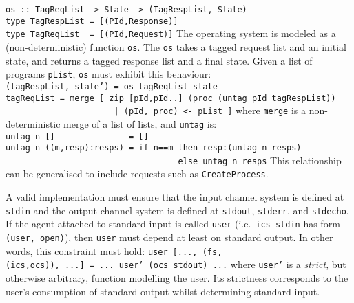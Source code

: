 \bprog
\mbox{\tt os\ ::\ TagReqList\ ->\ State\ ->\ (TagRespList,\ State)}\\
\mbox{\tt type\ TagRespList\ =\ [(PId,Response)]}\\
\mbox{\tt type\ TagReqList\ \ =\ [(PId,Request)]}
\eprog
The operating system is modeled as a (non-deterministic) function
\mbox{\tt os}. The \mbox{\tt os} takes a tagged request list and an initial state, and
returns a tagged response list and a final state.  Given a list of
programs \mbox{\tt pList}, \mbox{\tt os} must exhibit this behaviour:
\bprog
\mbox{\tt (tagRespList,\ state')\ =\ os\ tagReqList\ state}\\
\mbox{\tt tagReqList\ =\ merge\ [\ zip\ [pId,pId..]\ (proc\ (untag\ pId\ tagRespList))}\\
\mbox{\tt \ \ \ \ \ \ \ \ \ \ \ \ \ \ \ \ \ \ \ \ \ \ |\ (pId,\ proc)\ <-\ pList\ ]}
\eprog
where \mbox{\tt merge} is a non-deterministic merge of a list of lists, and
\mbox{\tt untag} is:
\bprog
\mbox{\tt untag\ n\ []\ \ \ \ \ \ \ \ \ \ \ \ \ \ \ =\ []}\\
\mbox{\tt untag\ n\ ((m,resp):resps)\ =\ if\ n==m\ then\ resp:(untag\ n\ resps)}\\
\mbox{\tt \ \ \ \ \ \ \ \ \ \ \ \ \ \ \ \ \ \ \ \ \ \ \ \ \ \ \ \ \ \ \ \ \ \ \ else\ untag\ n\ resps}
\eprog
This relationship can be generalised to
include requests such as \mbox{\tt CreateProcess}.

A valid implementation must ensure that the input channel
system is defined at \mbox{\tt stdin} and the output channel system is
defined at \mbox{\tt stdout}, \mbox{\tt stderr}, and \mbox{\tt stdecho}.  If the agent
attached to standard input is called \mbox{\tt user} (i.e.~\mbox{\tt ics\ stdin} has
form \mbox{\tt (user,\ open)}), then \mbox{\tt user} must depend at least on
standard output.  In other words, this constraint must hold:
\bprog
\mbox{\tt user\ [...,\ (fs,(ics,ocs)),\ ...]\ =\ ...\ user'\ (ocs\ stdout)\ ...}
\eprog
where \mbox{\tt user'} is a {\em strict}, but otherwise arbitrary, function
modelling the user.  Its strictness corresponds to the user's
consumption of standard output whilst determining
standard input.

